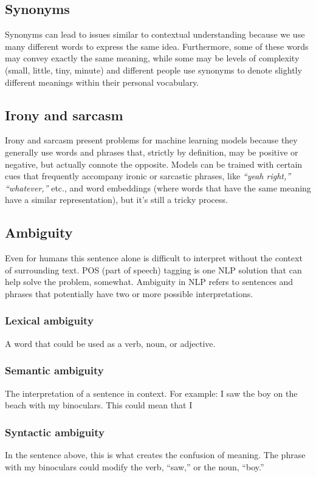 \documentclass[11pt]{article}
\begin{document}
\subsection{Synonyms}
\label{sec:org7c88daf}
Synonyms can lead to issues similar to contextual understanding because we use
many different words to express the same idea. Furthermore, some of these words
may convey exactly the same meaning, while some may be levels of complexity
(small, little, tiny, minute) and different people use synonyms to denote slightly
different meanings within their personal vocabulary.
\subsection{Irony and sarcasm}
\label{sec:orgded03a2}
Irony and sarcasm present problems for machine learning models because they generally
use words and phrases that, strictly by definition, may be positive or negative, but
actually connote the opposite.
Models can be trained with certain cues that frequently accompany ironic or sarcastic
phrases, like \emph{“yeah right,” “whatever,”} etc., and word embeddings (where words that
have the same meaning have a similar representation), but it’s still a tricky process.
\subsection{Ambiguity}
\label{sec:orge705ec7}
Even for humans this sentence alone is difficult to interpret without
the context of surrounding text. POS (part of speech) tagging is one NLP solution
that can help solve the problem, somewhat.
Ambiguity in NLP refers to sentences and phrases that potentially have two or more
possible interpretations.

\subsubsection{Lexical ambiguity}
\label{sec:org6a49c10}
A word that could be used as a verb, noun, or adjective.
\subsubsection{Semantic ambiguity}
\label{sec:org7906ba5}
The interpretation of a sentence in context. For example: I saw the boy on the
beach with my binoculars. This could mean that I
\subsubsection{Syntactic ambiguity}
\label{sec:org473c99e}
In the sentence above, this is what creates the confusion of meaning.
The phrase with my binoculars could modify the verb, “saw,” or the noun, “boy.”
\end{document}
